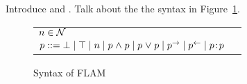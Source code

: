 Introduce \cite{Arden:2015:FA:2859845.2859998} and \cite{SRMMlio}. Talk about the the syntax in Figure~\ref{fig:flam-syntax}.

\begin{figure}[h]
    \centering
    \begin{tabular}{ll}
    $n \in \mathcal{N}$ \\
    $p ::= \bot \mid \top \mid n \mid p \mathrel{\land} p \mid p \mathrel{\lor} p \mid p^{\rightarrow} \mid p^{\leftarrow} \mid p\!:\!p$
    \end{tabular}
    \caption{Syntax of FLAM}
    \label{fig:flam-syntax}
\end{figure}

